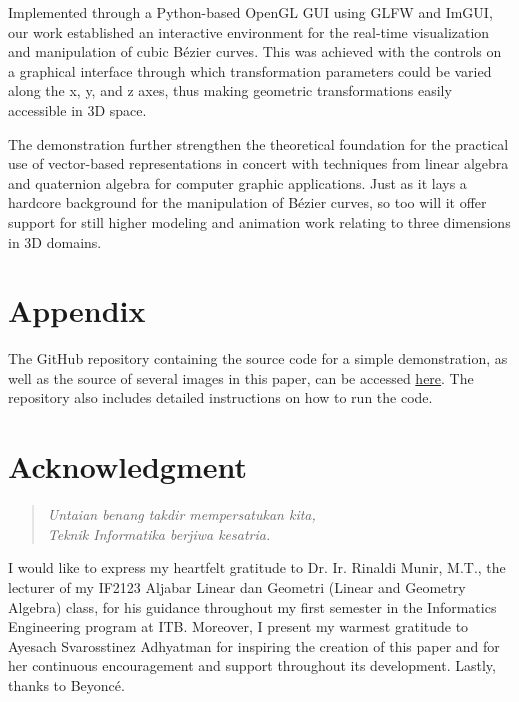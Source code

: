 \documentclass[conference]{IEEEtran}
\begin{document}
Implemented through a Python-based OpenGL GUI using GLFW and ImGUI, our work established an interactive environment for the real-time visualization and manipulation of cubic Bézier curves. This was achieved with the controls on a graphical interface through which transformation parameters could be varied along the x, y, and z axes, thus making geometric transformations easily accessible in 3D space.

The demonstration further strengthen the theoretical foundation for the practical use of vector-based representations in concert with techniques from linear algebra and quaternion algebra for computer graphic applications. Just as it lays a hardcore background for the manipulation of Bézier curves, so too will it offer support for still higher modeling and animation work relating to three dimensions in 3D domains.

    
\section{Appendix}
    The GitHub repository containing the source code for a simple demonstration, as well as the source of several images in this paper, can be accessed \href{https://github.com/nayakazna}{\color{blue} here}. The repository also includes detailed instructions on how to run the code.

\section{Acknowledgment}

\begin{quote}
    \textit{Untaian benang takdir mempersatukan kita, \\
    Teknik Informatika berjiwa kesatria.}
\end{quote}

I would like to express my heartfelt gratitude to Dr. Ir. Rinaldi Munir, M.T., the lecturer of my IF2123 Aljabar 
Linear dan Geometri (Linear and Geometry Algebra) class, for his guidance throughout my first semester 
in the Informatics Engineering program at ITB. Moreover, I present my warmest gratitude to Ayesach Svarosstinez
Adhyatman for inspiring the creation of this paper and for her continuous encouragement and support throughout 
its development. Lastly, thanks to Beyoncé.

\end{document}
